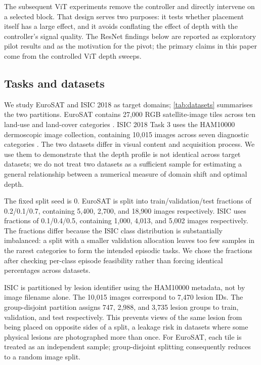 \documentclass[11pt]{article}
\begin{document}
The subsequent ViT experiments remove the controller and directly intervene on a selected block. That design serves two purposes: it tests whether placement itself has a large effect, and it avoids conflating the effect of depth with the controller's signal quality. The ResNet findings below are reported as exploratory pilot results and as the motivation for the pivot; the primary claims in this paper come from the controlled ViT depth sweeps.

\subsection{Tasks and datasets}

We study EuroSAT and ISIC 2018 as target domains; \cref{tab:datasets} summarises the two partitions. EuroSAT contains 27,000 RGB satellite-image tiles across ten land-use and land-cover categories \cite{helber2019}. ISIC 2018 Task 3 uses the HAM10000 dermoscopic image collection, containing 10,015 images across seven diagnostic categories \cite{tschandl2018,codella2019}. The two datasets differ in visual content and acquisition process. We use them to demonstrate that the depth profile is not identical across target datasets; we do not treat two datasets as a sufficient sample for estimating a general relationship between a numerical measure of domain shift and optimal depth.

The fixed split seed is 0. EuroSAT is split into train/validation/test fractions of 0.2/0.1/0.7, containing 5,400, 2,700, and 18,900 images respectively. ISIC uses fractions of 0.1/0.4/0.5, containing 1,000, 4,013, and 5,002 images respectively. The fractions differ because the ISIC class distribution is substantially imbalanced: a split with a smaller validation allocation leaves too few samples in the rarest categories to form the intended episodic tasks. We chose the fractions after checking per-class episode feasibility rather than forcing identical percentages across datasets.

ISIC is partitioned by lesion identifier using the HAM10000 metadata, not by image filename alone. The 10,015 images correspond to 7,470 lesion IDs. The group-disjoint partition assigns 747, 2,988, and 3,735 lesion groups to train, validation, and test respectively. This prevents views of the same lesion from being placed on opposite sides of a split, a leakage risk in datasets where some physical lesions are photographed more than once. For EuroSAT, each tile is treated as an independent sample; group-disjoint splitting consequently reduces to a random image split.
\end{document}
